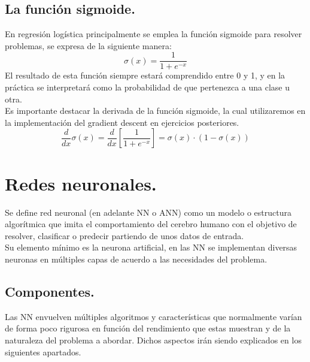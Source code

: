 \documentclass[a4paper,10pt]{article}
\begin{document}
\subsection{La función sigmoide.}
En regresión logística principalmente se emplea la función sigmoide para resolver problemas, se expresa de la siguiente manera: 
\[
\sigma(x)=\frac{1}{1+e^{-x}}
\]
El resultado de esta función siempre estará comprendido entre 0 y 1, y en la práctica se interpretará como la probabilidad de que pertenezca a una clase u otra.\\
Es importante destacar la derivada de la función sigmoide, la cual utilizaremos en la implementación del gradient descent en ejercicios posteriores.
\[
\frac{d}{dx}\sigma(x)=\frac{d}{dx}\left[\frac{1}{1+e^{-x}}\right]=\sigma(x)\cdot(1-\sigma(x))
\]




\newpage
\section{Redes neuronales.}

Se define red neuronal (en adelante NN o ANN) como un modelo o estructura algorítmica que imita el comportamiento del cerebro humano con el objetivo de resolver, clasificar o predecir partiendo de unos datos de entrada.\\
Su elemento mínimo es la neurona artificial, en las NN se implementan diversas neuronas en múltiples capas de acuerdo a las necesidades del problema.

\subsection{Componentes.}
Las NN envuelven múltiples algoritmos y características que normalmente varían de forma poco rigurosa en función del rendimiento que estas muestran y de la naturaleza del problema a abordar. Dichos aspectos irán siendo explicados en los siguientes apartados.
\end{document}

